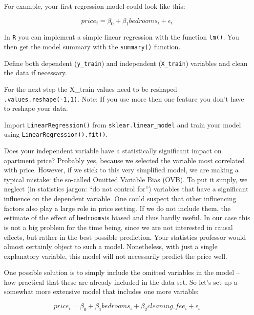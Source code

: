 \documentclass[
  11pt,
]{article}
\newenvironment{tips}[1]
  {
  \begin{itemize}
  \footnotesize
  \renewcommand{\labelitemi}{
    \raisebox{-.7\height}[0pt][0pt]{
      {\setkeys{Gin}{width=3em,keepaspectratio}
        \texttt{[image: images/\#1.png]}}
    }
  }
  \setlength{\fboxsep}{1em}
  \begin{rbox}
  \item
  }
  {
  \end{rbox}
  \end{itemize}
  }
\newenvironment{tipsp}[1]
  {
  \begin{itemize}
  \footnotesize
  \renewcommand{\labelitemi}{
    \raisebox{-.7\height}[0pt][0pt]{
      {\setkeys{Gin}{width=3em,keepaspectratio}
        \texttt{[image: images/\#1.png]}}
    }
  }
  \setlength{\fboxsep}{1em}
  \begin{pbox}
  \item
  }
  {
  \end{pbox}
  \end{itemize}
  }
\begin{document}
For example, your first regression model could look like this:

\[price_i = \beta_0 + \beta_1 bedrooms_i + \epsilon_i\]

\begin{tips}r
In \texttt{R} you can implement a simple linear regression with the function \texttt{lm()}. You then get the model summary with the \texttt{summary()} function.

\end{tips}

\begin{tipsp}p
Define both dependent (\texttt{y\_train}) and independent (\texttt{X\_train}) variables and clean the data if necessary.

For the next step the X\_train values need to be reshaped \texttt{.values.reshape(-1,1)}.
Note: If you use more then one feature you don't have to reshape your data.

Import \texttt{LinearRegression()} from \texttt{sklear.linear\_model} and train your model using \texttt{LinearRegression().fit()}.

\end{tipsp}

Does your independent variable have a statistically significant impact on apartment price? Probably yes, because we selected the variable most correlated with price. However, if we stick to this very simplified model, we are making a typical mistake: the so-called Omitted Variable Bias (OVB). To put it simply, we neglect (in statistics jargon: ``do not control for'') variables that have a significant influence on the dependent variable. One could suspect that other influencing factors also play a large role in price setting. If we do not include them, the estimate of the effect of \texttt{bedrooms}is biased and thus hardly useful. In our case this is not a big problem for the time being, since we are not interested in causal effects, but rather in the best possible prediction. Your statistics professor would almost certainly object to such a model. Nonetheless, with just a single explanatory variable, this model will not necessarily predict the price well.

One possible solution is to simply include the omitted variables in the model -- how practical that these are already included in the data set. So let's set up a somewhat more extensive model that includes one more variable:

\[price_i = \beta_0 + \beta_1 bedrooms_i + \beta_2 cleaning\_fee_i + \epsilon_i\]
\end{document}
